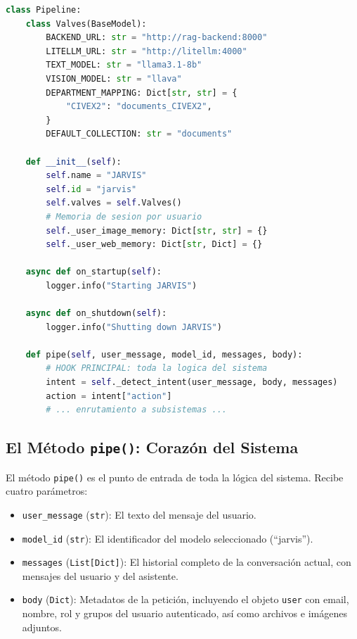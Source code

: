\begin{lstlisting}[language=Python, caption={Estructura del Pipeline JARVIS.}]
class Pipeline:
    class Valves(BaseModel):
        BACKEND_URL: str = "http://rag-backend:8000"
        LITELLM_URL: str = "http://litellm:4000"
        TEXT_MODEL: str = "llama3.1-8b"
        VISION_MODEL: str = "llava"
        DEPARTMENT_MAPPING: Dict[str, str] = {
            "CIVEX2": "documents_CIVEX2",
        }
        DEFAULT_COLLECTION: str = "documents"

    def __init__(self):
        self.name = "JARVIS"
        self.id = "jarvis"
        self.valves = self.Valves()
        # Memoria de sesion por usuario
        self._user_image_memory: Dict[str, str] = {}
        self._user_web_memory: Dict[str, Dict] = {}

    async def on_startup(self):
        logger.info("Starting JARVIS")

    async def on_shutdown(self):
        logger.info("Shutting down JARVIS")

    def pipe(self, user_message, model_id, messages, body):
        # HOOK PRINCIPAL: toda la logica del sistema
        intent = self._detect_intent(user_message, body, messages)
        action = intent["action"]
        # ... enrutamiento a subsistemas ...
\end{lstlisting}

\subsection{El Método \texttt{pipe()}: Corazón del Sistema}

El método \texttt{pipe()} es el punto de entrada de toda la lógica del sistema. Recibe cuatro parámetros:

\begin{itemize}
    \item \texttt{user\_message} (\texttt{str}): El texto del mensaje del usuario.
    \item \texttt{model\_id} (\texttt{str}): El identificador del modelo seleccionado (``jarvis'').
    \item \texttt{messages} (\texttt{List[Dict]}): El historial completo de la conversación actual, con mensajes del usuario y del asistente.
    \item \texttt{body} (\texttt{Dict}): Metadatos de la petición, incluyendo el objeto \texttt{user} con email, nombre, rol y grupos del usuario autenticado, así como archivos e imágenes adjuntos.
\end{itemize}

